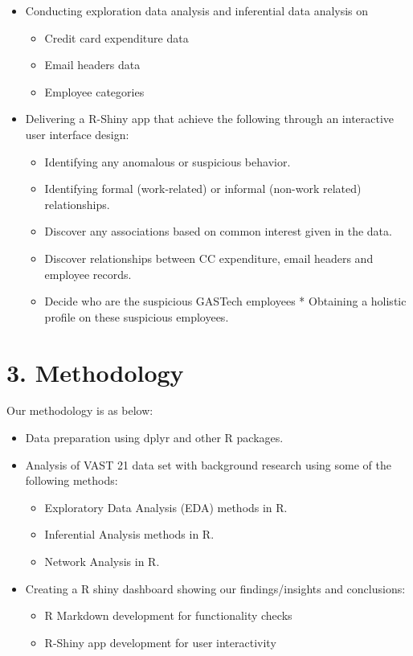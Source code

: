 \documentclass{acm_proc_article-sp}
\providecommand{\tightlist}{%
  \setlength{\itemsep}{0pt}\setlength{\parskip}{0pt}}
\begin{document}
\begin{itemize}
\tightlist
\item
  Conducting exploration data analysis and inferential data analysis on

  \begin{itemize}
  \tightlist
  \item
    Credit card expenditure data
  \item
    Email headers data
  \item
    Employee categories
  \end{itemize}
\item
  Delivering a R-Shiny app that achieve the following through an interactive user interface design:

  \begin{itemize}
  \tightlist
  \item
    Identifying any anomalous or suspicious behavior.
  \item
    Identifying formal (work-related) or informal (non-work related) relationships.\\
  \item
    Discover any associations based on common interest given in the data.\\
  \item
    Discover relationships between CC expenditure, email headers and employee records.
  \item
    Decide who are the suspicious GASTech employees * Obtaining a holistic profile on these suspicious employees.
  \end{itemize}
\end{itemize}

\hypertarget{methodology}{%
\section{3. Methodology}\label{methodology}}

Our methodology is as below:

\begin{itemize}
\item
  Data preparation using dplyr and other R packages.
\item
  Analysis of VAST 21 data set with background research using some of the following methods:

  \begin{itemize}
  \tightlist
  \item
    Exploratory Data Analysis (EDA) methods in R.
  \item
    Inferential Analysis methods in R.
  \item
    Network Analysis in R.
  \end{itemize}
\item
  Creating a R shiny dashboard showing our findings/insights and conclusions:

  \begin{itemize}
  \tightlist
  \item
    R Markdown development for functionality checks
  \item
    R-Shiny app development for user interactivity
  \end{itemize}
\end{itemize}
\end{document}

